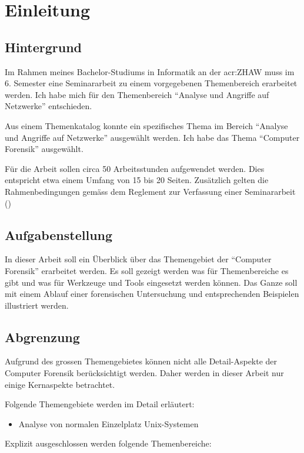 
\chapter{Einleitung}


\section{Hintergrund}
Im Rahmen meines Bachelor-Studiums in Informatik an der \gls{acr:ZHAW} muss im 6. Semester eine Seminararbeit zu einem vorgegebenen Themenbereich erarbeitet werden. Ich habe mich für den Themenbereich "`Analyse und Angriffe auf Netzwerke"' entschieden.

Aus einem Themenkatalog konnte ein spezifisches Thema im Bereich "`Analyse und Angriffe auf Netzwerke"' ausgewählt werden. Ich habe das Thema "`Computer Forensik"' ausgewählt.

Für die Arbeit sollen circa 50 Arbeitsstunden aufgewendet werden. Dies entspricht etwa einem Umfang von 15 bis 20 Seiten. Zusätzlich gelten die Rahmenbedingungen gemäss dem Reglement zur Verfassung einer Seminararbeit (\cite{ZHAW:2012:Seminararbeit:Reglemente})

\section{Aufgabenstellung}
In dieser Arbeit soll ein Überblick über das Themengebiet der "`Computer Forensik"' erarbeitet werden. Es soll gezeigt werden was für Themenbereiche es gibt und was für Werkzeuge und Tools eingesetzt werden können. Das Ganze soll mit einem Ablauf einer forensischen Untersuchung und entsprechenden Beispielen illustriert werden.

\section{Abgrenzung}
Aufgrund des grossen Themengebietes können nicht alle Detail-Aspekte der Computer Forensik berücksichtigt werden. Daher werden in dieser Arbeit nur einige Kernaspekte betrachtet. 

Folgende Themengebiete werden im Detail erläutert:
\begin{itemize}
\item Analyse von normalen Einzelplatz Unix-Systemen
\end{itemize}

Explizit ausgeschlossen werden folgende Themenbereiche:

